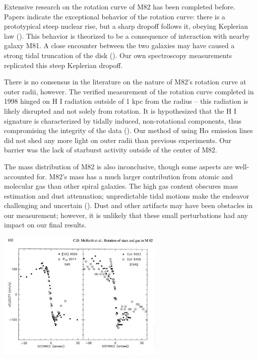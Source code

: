 \documentclass[useAMS,usenatbib]{mn2e}
\begin{document}
Extensive research on the rotation curve of M82 has been completed before. Papers indicate the exceptional behavior of the rotation curve: there is a prototypical steep nuclear rise, but a sharp dropoff follows it, obeying Keplerian law (\cite{rotation}). This behavior is theorized to be a consequence of interaction with nearby galaxy M81. A close encounter between the two galaxies may have caused a strong tidal truncation of the disk (\cite{encounter}). Our own spectroscopy measurements replicated this steep Keplerian dropoff.

There is no consensus in the literature on the nature of M82's rotation curve at outer radii, however. The verified measurement of the rotation curve completed in 1998 hinged on H I radiation outside of 1 kpc from the radius -- this radiation is likely disrupted and not solely from rotation. It is hypothesized that the H I signature is characterized by tidally induced, non-rotational components, thus compromising the integrity of the data (\cite{peculiar}). Our method of using H$\alpha$ emission lines did not shed any more light on outer radii than previous experiments. Our barrier was the lack of starburst activity outside of the center of M82.

The mass distribution of M82 is also inconclusive, though some aspects are well-accounted for. M82's mass has a much larger contribution from atomic and molecular gas than other spiral galaxies. The high gas content obscures mass estimation and dust attenuation; unpredictable tidal motions make the endeavor challenging and uncertain (\cite{measure}). Dust and other artifacts may have been obstacles in our measurement; however, it is unlikely that these small perturbations had any impact on our final results.


{\centering \includegraphics[width=228pt]{rotationcurve.jpg}\par}
\end{document}

